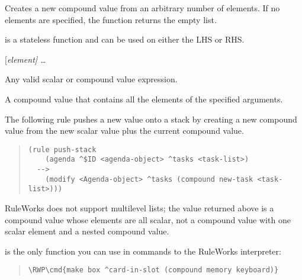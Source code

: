 Creates a new compound value from an arbitrary number of elements. If
no elements are specified, the function returns the empty list.

 is a stateless function and can be used on either the
LHS or RHS.

\Format

 [\it{element}] \ldots

\begin{argument}
\item[element]

  Any valid scalar or compound value expression.
\end{argument}

\ReturnValue

A compound value that contains all the elements of the
specified arguments.

\Example

The following rule pushes a new value onto a stack by creating a new
compound value from the new scalar value plus the current compound
value.

\begin{quote}
\begin{verbatim}
(rule push-stack
    (agenda ^$ID <agenda-object> ^tasks <task-list>)
  -->
    (modify <Agenda-object> ^tasks (compound new-task <task-list>)))
\end{verbatim}
\end{quote}

\begin{note}
  RuleWorks does not support multilevel lists; the value returned
  above is a compound value whose elements are all scalar, not a
  compound value with one scalar element and a nested compound value.
\end{note}

 is the only function you can use in commands to the
RuleWorks interpreter:

\begin{quote}
\begin{Verbatim}[commandchars=\\\{\}]
\RWP\cmd{make box ^card-in-slot (compound memory keyboard)}
\end{Verbatim}
\end{quote}

\subsection{}

